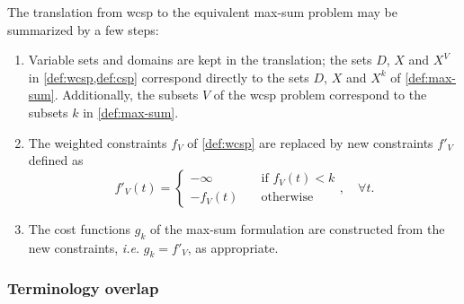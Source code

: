 The translation from \gls{wcsp} to the equivalent max-sum problem may be summarized by a few steps:
\begin{enumerate}
	\item Variable sets and domains are kept in the translation; the sets \(D\), \(X\) and \(X^V\) in \cref{def:wcsp,def:csp} correspond directly to the sets \(D\), \(X\) and \(X^k\) of \cref{def:max-sum}. Additionally, the subsets \(V\) of the \gls{wcsp} problem correspond to the subsets \(k\) in \cref{def:max-sum}.
	\item The weighted constraints \(f_V\) of \cref{def:wcsp} are replaced by new constraints \(f'_V\) defined as
	\begin{equation*}
		f'_V(t) = \begin{cases}
			-\infty &\quad \text{if \(f_V(t) < k\)} \\
			-f_V(t) &\quad \text{otherwise}
		\end{cases}, \quad \forall t.
	\end{equation*}
	\item The cost functions \(g_k\) of the max-sum formulation are constructed from the new constraints, \emph{i.e.} \(g_k = f'_V\), as appropriate.
\end{enumerate}

\subsubsection{Terminology overlap}
